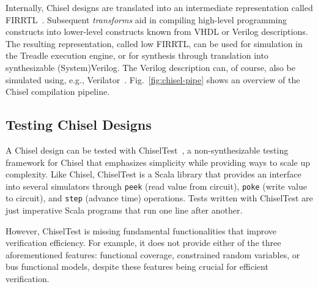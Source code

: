 \documentclass[conference]{IEEEtran}
\begin{document}
Internally, Chisel designs are translated into an intermediate representation called 
FIRRTL~\cite{firrtl}. Subsequent \textit{transforms} aid in compiling high-level programming 
constructs into lower-level constructs known from VHDL or Verilog descriptions. The resulting 
representation, called low FIRRTL, can be used for simulation in the Treadle execution 
engine, or for synthesis through translation into synthesizable (System)Verilog. The 
Verilog description can, of course, also be simulated using, e.g., Verilator~\cite{verilator}. 
Fig.~\ref{fig:chisel-pipe} shows an overview of the Chisel compilation pipeline.

\subsection{Testing Chisel Designs}

A Chisel design can be tested with ChiselTest~\cite{chisel:tester2}, a non-synthesizable 
testing framework for Chisel that emphasizes simplicity while providing ways to scale up 
complexity. Like Chisel, ChiselTest is a Scala library that provides an interface into several 
simulators through \texttt{peek} (read value from circuit), \texttt{poke} (write value to 
circuit), and \texttt{step} (advance time) operations. Tests written with ChiselTest are just 
imperative Scala programs that run one line after another.


However, ChiselTest is missing fundamental functionalities that improve verification efficiency. 
For example, it does not provide either of the three aforementioned features: functional 
coverage, constrained random variables, or bus functional models, despite these features being 
crucial for efficient verification.
\end{document}
